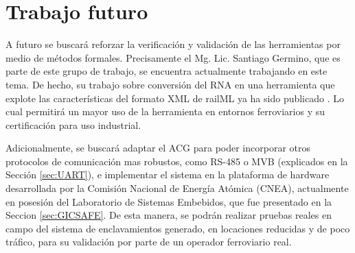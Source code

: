 \section{Trabajo futuro}

A futuro se buscará reforzar la verificación y validación de las herramientas por medio de métodos formales. Precisamente el Mg. Lic. Santiago Germino, que es parte de este grupo de trabajo, se encuentra actualmente trabajando en este tema. De hecho, su trabajo sobre conversión del RNA en una herramienta que explote las características del formato XML de railML ya ha sido publicado \cite{Paper_207}. Lo cual permitirá un mayor uso de la herramienta en entornos ferroviarios y su certificación para uso industrial.

Adicionalmente, se buscará adaptar el ACG para poder incorporar otros protocolos de comunicación mas robustos, como RS-485 o MVB (explicados en la Sección \ref{sec:UART}), e implementar el sistema en la plataforma de hardware desarrollada por la Comisión Nacional de Energía Atómica (CNEA), actualmente en posesión del Laboratorio de Sistemas Embebidos, que fue presentado en la Seccion \ref{sec:GICSAFE}. De esta manera, se podrán realizar pruebas reales en campo del sistema de enclavamientos generado, en locaciones reducidas y de poco tráfico, para su validación por parte de un operador ferroviario real.



